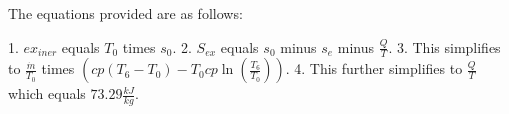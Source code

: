 The equations provided are as follows:

1. \( ex_{iner} \) equals \( T_0 \) times \( s_0 \).
2. \( S_{ex} \) equals \( s_0 \) minus \( s_e \) minus \( \frac{Q}{T} \).
3. This simplifies to \( \frac{\dot{m}}{T_0} \) times \( \left( cp \left( T_6 - T_0 \right) - T_0 cp \ln \left( \frac{T_6}{T_0} \right) \right) \).
4. This further simplifies to \( \frac{Q}{T} \) which equals \( 73.29 \frac{kJ}{kg} \).
